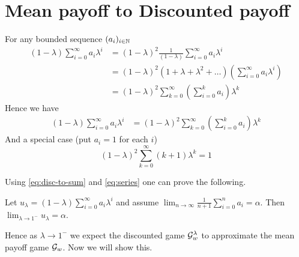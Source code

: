 \section{Mean payoff to Discounted payoff}

For any bounded sequence $(a_i)_{i \in \mathbb{N}}$
\begin{align*}
    (1-\lambda) \sum_{i=0}^\infty a_i \lambda^i  &= (1-\lambda)^2 \frac{1}{(1-\lambda)} \sum_{i=0}^\infty a_i\lambda^i\\
    &= (1-\lambda)^2 (1+\lambda+\lambda^2+\ldots) (\sum_{i=0}^\infty a_i \lambda^i)\\
    &= (1-\lambda)^2 \sum_{k=0}^\infty \left(\sum_{i=0}^k a_i\right) \lambda^k
\end{align*}
Hence we have
\begin{align}
    (1-\lambda)\sum_{i=0}^\infty a_i\lambda^i &= (1-\lambda)^2\sum_{k=0}^\infty \left(\sum_{i=0}^k a_i\right) \lambda^k \label{eq:disc-to-sum}
\end{align}
And a special case (put $a_i = 1$ for each $i$)
\begin{equation}
    (1-\lambda)^2 \sum_{k=0}^\infty (k+1)\lambda^k = 1 \label{eq:series}
\end{equation}

Using \eqref{eq:disc-to-sum} and \eqref{eq:series} one can prove the following.
\begin{theorem}
    Let $u_\lambda=(1-\lambda) \sum_{i=0}^\infty a_i \lambda^i$ and assume $\lim_{n \to \infty} \frac{1}{n+1}\sum_{i=0}^n a_i = \alpha$. Then $\lim_{\lambda \to 1^-} u_\lambda = \alpha$.
\end{theorem}

Hence as $\lambda \to 1^-$ we expect the discounted game $\mathcal{G}^\lambda_w$ to approximate the mean payoff game $\mathcal{G}_w$. Now we will show this.

